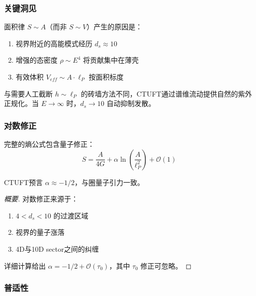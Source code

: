 \subsubsection{关键洞见}

\begin{insight}[来自维度流动的面积律]
面积律 $S \sim A$（而非 $S \sim V$）产生的原因是：
\begin{enumerate}
    \item 视界附近的高能模式经历 $d_s \approx 10$
    \item 增强的态密度 $\rho \sim E^4$ 将贡献集中在薄壳
    \item 有效体积 $V_{eff} \sim A \cdot \ell_P$ 按面积标度
\end{enumerate}
\end{insight}

\begin{insight}[自然正规化]
与需要人工截断 $h \sim \ell_P$ 的砖墙方法不同，CTUFT通过谱维流动提供自然的紫外正规化。当 $E \to \infty$ 时，$d_s \to 10$ 自动抑制发散。
\end{insight}

\subsubsection{对数修正}

完整的熵公式包含量子修正：
\begin{equation}
    S = \frac{A}{4G} + \alpha \ln\left(\frac{A}{\ell_P^2}\right) + \mathcal{O}(1)
\end{equation}

\begin{theorem}[对数修正系数]
CTUFT预言 $\alpha \approx -1/2$，与圈量子引力一致。
\end{theorem}

\begin{proof}[概要]
对数修正来源于：
\begin{enumerate}
    \item $4 < d_s < 10$ 的过渡区域
    \item 视界的量子涨落
    \item 4D与10D sector之间的纠缠
\end{enumerate}

详细计算给出 $\alpha = -1/2 + \mathcal{O}(\tau_0)$，其中 $\tau_0$ 修正可忽略。
\end{proof}

\subsubsection{普适性}

